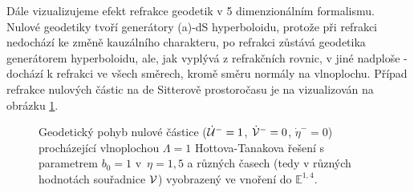 Dále vizualizujeme efekt refrakce geodetik v 5 dimenzionálním formalismu. Nulové geodetiky tvoří generátory (a)-dS hyperboloidu, protože při refrakci nedochází
ke změně kauzálního charakteru, po refrakci zůstává geodetika generátorem hyperboloidu, ale, jak vyplývá z refrakčních rovnic, v jiné nadploše - dochází k refrakci
ve všech směrech, kromě směru normály na vlnoplochu. Případ refrakce nulových částic na de Sitterově prostoročasu je na vizualizován na obrázku \ref{fig:HottaTanaka5D}.

\begin{figure}[ht]
    \centering
    \caption{Geodetický pohyb nulové částice ($\dot {\mathcal{U}}^-=1$, $\dot {\mathcal{V}}^-=0$, $\dot \eta^-=0$) procházející vlnoplochou $\Lambda=1$ Hottova-Tanakova řešení s parametrem $b_0 = 1$ v~$\eta=1,5$ a různých časech (tedy v různých hodnotách souřadnice $\mathcal{V}$) vyobrazený ve vnoření do $\mathbb{E}^{1,4}$.}
    \label{fig:HottaTanaka5D}
\end{figure}